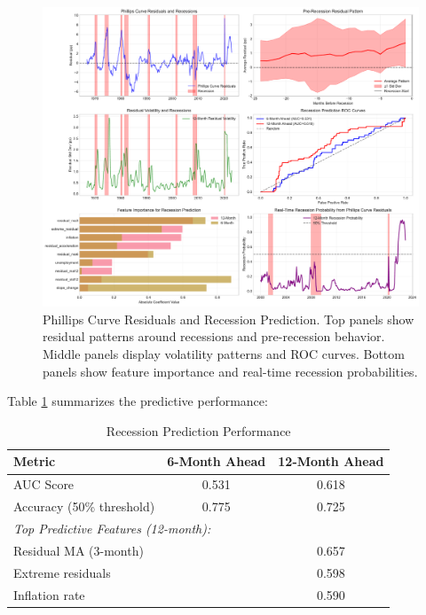 \documentclass[12pt]{article}
\begin{document}
\begin{figure}[htbp]
    \centering
    \includegraphics[width=\textwidth]{figures/recession_prediction_analysis.pdf}
    \caption{Phillips Curve Residuals and Recession Prediction. Top panels show residual patterns around recessions and pre-recession behavior. Middle panels display volatility patterns and ROC curves. Bottom panels show feature importance and real-time recession probabilities.}
    \label{fig:recession_prediction}
\end{figure}

Table \ref{tab:recession_results} summarizes the predictive performance:

\begin{table}[htbp]
\centering
\caption{Recession Prediction Performance}
\label{tab:recession_results}
\begin{tabular}{lcc}
\toprule
Metric & 6-Month Ahead & 12-Month Ahead \\
\midrule
AUC Score & 0.531 & 0.618 \\
Accuracy (50\% threshold) & 0.775 & 0.725 \\
\midrule
\multicolumn{3}{l}{\textit{Top Predictive Features (12-month):}} \\
\quad Residual MA (3-month) & & 0.657 \\
\quad Extreme residuals & & 0.598 \\
\quad Inflation rate & & 0.590 \\
\bottomrule
\end{tabular}
\end{table}
\end{document}
